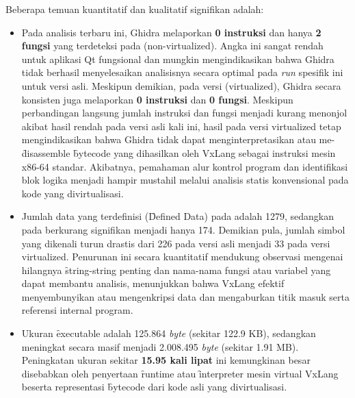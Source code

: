 Beberapa temuan kuantitatif dan kualitatif signifikan adalah:
\begin{itemize}
    \item {}
    Pada analisis terbaru ini, Ghidra melaporkan \textbf{0 instruksi} dan hanya \textbf{2 fungsi} yang terdeteksi pada  (non-virtualized). Angka ini sangat rendah untuk aplikasi Qt fungsional dan mungkin mengindikasikan bahwa Ghidra tidak berhasil menyelesaikan analisisnya secara optimal pada \textit{run} spesifik ini untuk versi asli. Meskipun demikian, pada versi  (virtualized), Ghidra secara konsisten juga melaporkan \textbf{0 instruksi} dan \textbf{0 fungsi}. Meskipun perbandingan langsung jumlah instruksi dan fungsi menjadi kurang menonjol akibat hasil rendah pada versi asli kali ini, hasil pada versi virtualized tetap mengindikasikan bahwa Ghidra tidak dapat menginterpretasikan atau me-\f{disassemble} \f{bytecode} yang dihasilkan oleh VxLang sebagai instruksi mesin x86-64 standar. Akibatnya, pemahaman alur kontrol program dan identifikasi blok logika menjadi hampir mustahil melalui analisis statis konvensional pada kode yang divirtualisasi.

    \item {} Jumlah data yang terdefinisi (\f{Defined Data}) pada  adalah 1279, sedangkan pada  berkurang signifikan menjadi hanya 174. Demikian pula, jumlah simbol yang dikenali turun drastis dari 226 pada versi asli menjadi 33 pada versi virtualized. Penurunan ini secara kuantitatif mendukung observasi mengenai hilangnya \f{string-string} penting dan nama-nama fungsi atau variabel yang dapat membantu analisis, menunjukkan bahwa VxLang efektif menyembunyikan atau mengenkripsi data dan mengaburkan titik masuk serta referensi internal program.

    \item {} Ukuran \f{executable}  adalah 125.864 \textit{byte} (sekitar 122.9 KB), sedangkan  meningkat secara masif menjadi 2.008.495 \textit{byte} (sekitar 1.91 MB). Peningkatan ukuran sekitar \textbf{15.95 kali lipat} ini kemungkinan besar disebabkan oleh penyertaan \f{runtime} atau \f{interpreter} mesin virtual VxLang beserta representasi \f{bytecode} dari kode asli yang divirtualisasi.


\end{itemize}
